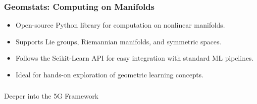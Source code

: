 \begin{frame}[fragile]\frametitle{Geomstats: Computing on Manifolds}
  \begin{itemize}
    \item Open-source Python library for computation on nonlinear manifolds.
    \item Supports Lie groups, Riemannian manifolds, and symmetric spaces.
    \item Follows the Scikit-Learn API for easy integration with standard ML pipelines.
    \item Ideal for hands-on exploration of geometric learning concepts.
  \end{itemize}
\end{frame}

\begin{frame}[fragile]\frametitle{}
\begin{center}
{\Large Deeper into the 5G Framework}
\end{center}
\end{frame}

